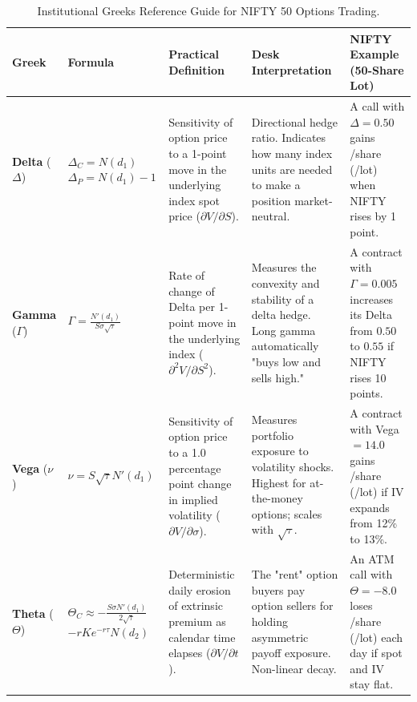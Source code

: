 \begin{table}[H]
    \centering
    \scriptsize
    \renewcommand{\arraystretch}{0.95}
    \caption{Institutional Greeks Reference Guide for NIFTY 50 Options Trading.}
    \label{tab:greeks_reference_guide}
    \begin{tabularx}{\textwidth}{lp{2.4cm}p{3.2cm}p{3.8cm}X}
        \toprule
        \textbf{Greek} & \textbf{Formula} & \textbf{Practical Definition} & \textbf{Desk Interpretation} & \textbf{NIFTY Example (50-Share Lot)} \\
        \midrule
        \textbf{Delta} ($\Delta$) & $\Delta_C = N(d_1)$ \newline $\Delta_P = N(d_1) - 1$ & Sensitivity of option price to a 1-point move in the underlying index spot price ($\partial V / \partial S$). & Directional hedge ratio. Indicates how many index units are needed to make a position market-neutral. & A call with $\Delta = 0.50$ gains \rupee 0.50/share (\rupee 25/lot) when NIFTY rises by 1 point. \\
        \addlinespace
        \textbf{Gamma} ($\Gamma$) & $\Gamma = \frac{N'(d_1)}{S \sigma \sqrt{\tau}}$ & Rate of change of Delta per 1-point move in the underlying index ($\partial^2 V / \partial S^2$). & Measures the convexity and stability of a delta hedge. Long gamma automatically "buys low and sells high." & A contract with $\Gamma = 0.005$ increases its Delta from $0.50$ to $0.55$ if NIFTY rises 10 points. \\
        \addlinespace
        \textbf{Vega} ($\nu$) & $\nu = S \sqrt{\tau} N'(d_1)$ & Sensitivity of option price to a 1.0 percentage point change in implied volatility ($\partial V / \partial \sigma$). & Measures portfolio exposure to volatility shocks. Highest for at-the-money options; scales with $\sqrt{\tau}$. & A contract with Vega $= 14.0$ gains \rupee 14/share (\rupee 700/lot) if IV expands from 12\% to 13\%. \\
        \addlinespace
        \textbf{Theta} ($\Theta$) & $\Theta_C \approx -\frac{S \sigma N'(d_1)}{2 \sqrt{\tau}}$ \newline $- r K e^{-r\tau} N(d_2)$ & Deterministic daily erosion of extrinsic premium as calendar time elapses ($\partial V / \partial t$). & The "rent" option buyers pay option sellers for holding asymmetric payoff exposure. Non-linear decay. & An ATM call with $\Theta = -8.0$ loses \rupee 8/share (\rupee 400/lot) each day if spot and IV stay flat. \\
        \bottomrule
    \end{tabularx}
\end{table}

